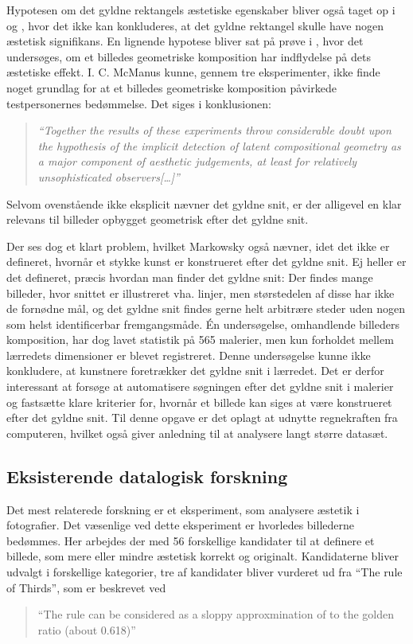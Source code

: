 {Hypotesen om det gyldne rektangels æstetiske egenskaber bliver også
taget op i \cite{Boselie1984} og \cite{Plug1980}, hvor det ikke kan
konkluderes, at det gyldne rektangel skulle have nogen æstetisk
signifikans. En lignende hypotese bliver sat på prøve i
\cite{McManus1995}, hvor det undersøges, om et billedes geometriske
komposition har indflydelse på dets æstetiske effekt. I. C. McManus
kunne, gennem tre eksperimenter, ikke finde noget grundlag for at et
billedes geometriske komposition påvirkede testpersonernes bedømmelse.
Det siges i konklusionen:

\begin{quote}
	\emph{``Together the results of these experiments throw
	considerable doubt upon the hypothesis of the implicit detection
	of latent compositional geometry as a major component of
	aesthetic judgements, at least for relatively unsophisticated
	observers[\dots]''}
\end{quote}

Selvom ovenstående ikke eksplicit nævner det gyldne snit, er der
alligevel en klar relevans til billeder opbygget geometrisk efter det
gyldne snit.

Der ses dog et klart problem, hvilket Markowsky også nævner, idet det
ikke er defineret, hvornår et stykke kunst er konstrueret efter det
gyldne snit. Ej heller er det defineret, præcis hvordan man finder det
gyldne snit: Der findes mange billeder, hvor snittet er illustreret vha.
linjer, men størstedelen af disse har ikke de fornødne mål, og det
gyldne snit findes gerne helt arbitrære steder uden nogen som helst
identificerbar fremgangsmåde.  Én undersøgelse, omhandlende billeders
komposition, har dog lavet statistik på 565 malerier, men kun forholdet
mellem lærredets dimensioner er blevet registreret\cite{Olariu1999}.
Denne undersøgelse kunne ikke konkludere, at kunstnere foretrækker det
gyldne snit i lærredet. Det er derfor interessant at forsøge at
automatisere søgningen efter det gyldne snit i malerier og fastsætte
klare kriterier for, hvornår et billede kan siges at være konstrueret
efter det gyldne snit.  Til denne opgave er det oplagt at udnytte
regnekraften fra computeren, hvilket også giver anledning til  at
analysere langt større datasæt.

\subsection{Eksisterende datalogisk forskning}
Det mest relaterede forskning er et eksperiment, som analysere æstetik i fotografier\cite{DattaWang}.
Det væsenlige ved dette eksperiment er hvorledes billederne
bedømmes. Her arbejdes der med 56 forskellige kandidater til at definere
et billede, som mere eller mindre æstetisk korrekt og originalt. 
Kandidaterne bliver udvalgt i forskellige kategorier, tre af kandidater 
bliver vurderet ud fra ``The rule of Thirds'', som er beskrevet ved
\begin{quote}
	``The rule can be considered as a sloppy approxmination of to the
	golden ratio (about 0.618)''
\end{quote}

}
